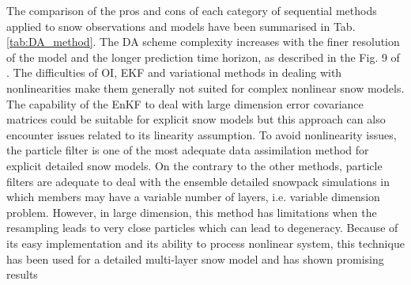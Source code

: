 \documentclass[utf8]{frontiersSCNS} %
\begin{document}

The comparison of the pros and cons of each category of sequential methods applied to snow observations and models have been summarised in Tab. \ref{tab:DA_method}. The DA scheme complexity increases with the finer resolution of the model and the longer prediction time horizon, as described in the Fig. 9 of \citet{Carrassi_2018}. The difficulties of OI, EKF and variational methods in dealing with nonlinearities make them generally not suited for complex nonlinear snow models. The capability of the EnKF to deal with large dimension error covariance matrices could be suitable for explicit snow models but this approach can also encounter issues related to its linearity assumption. To avoid nonlinearity issues, the particle filter is one of the most adequate data assimilation method for explicit detailed snow models. On the contrary to the other methods, particle filters are adequate to deal with the ensemble detailed snowpack simulations in which members may have a variable number of layers, i.e. variable dimension problem. However, in large dimension, this method has limitations when the resampling leads to very close particles which can lead to degeneracy. Because of its easy implementation and its ability to process nonlinear system, this technique has been used for a detailed multi-layer snow model and has shown promising results \citep[e.g.][]{Charrois_2016,Magnusson_2017}
\end{document}
